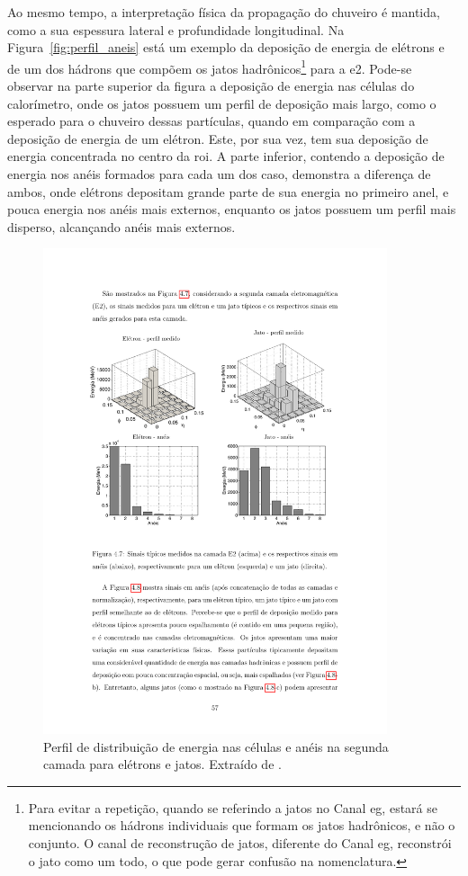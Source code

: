Ao mesmo tempo, a interpretação física da propagação do
chuveiro é mantida, como a sua espessura lateral e profundidade longitudinal. 
Na Figura~\ref{fig:perfil_aneis} está um 
exemplo da deposição de energia de elétrons e de um dos hádrons que
compõem os jatos hadrônicos\footnote{Para evitar a repetição, quando se
referindo a jatos no Canal \gls{eg}, estará se mencionando os hádrons individuais
que formam os jatos hadrônicos, e não o conjunto. O canal de reconstrução de
jatos, diferente do Canal \gls{eg}, reconstrói o jato como um todo, 
o que pode gerar confusão na nomenclatura.} para a \gls{e2}. Pode-se observar na parte
superior da figura a deposição de energia nas células do calorímetro, onde os
jatos possuem um perfil de deposição mais largo, como o esperado para o chuveiro
dessas partículas, quando em comparação com a deposição de energia de um
elétron. Este, por sua vez, tem sua deposição de energia concentrada no centro da
\gls{roi}. A parte inferior, contendo a deposição de energia nos anéis formados 
para cada um dos caso, demonstra a diferença de ambos, onde elétrons depositam grande parte de
sua energia no primeiro anel, e pouca energia nos anéis mais externos, enquanto
os jatos possuem um perfil mais disperso, alcançando anéis mais externos.

\begin{figure}[ht!]
\label{fig:perfil_segunda_camada}
\centering
\includegraphics[width=0.9\textwidth]{imagens/segunda_camada_celulas.pdf}
\caption[Perfil de distribuição de energia nas células e anéis na segunda camada para 
elétrons e jatos.]{Perfil de distribuição de energia nas células e anéis na segunda camada 
para elétrons e jatos. Extraído de \cite{tese_eduardo}.}
\end{figure}

